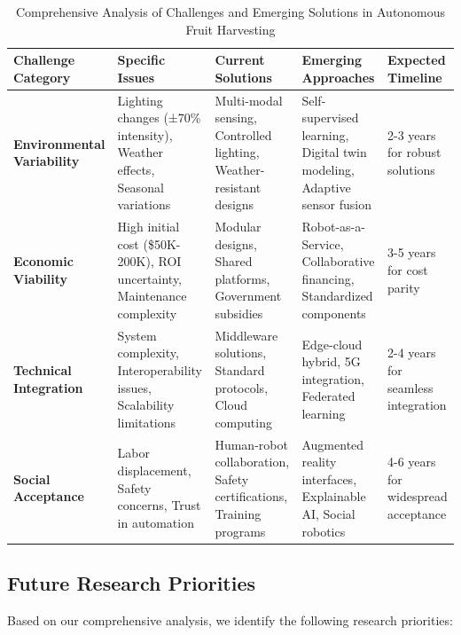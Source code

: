 \documentclass[a4paper,fleqn]{cas-dc}
\begin{document}
\begin{table}[htbp]
\centering
\footnotesize
\caption{Comprehensive Analysis of Challenges and Emerging Solutions in Autonomous Fruit Harvesting}
\label{tab:challenges_comprehensive}
\begin{tabular}{p{}p{}p{}p{}p{}}
\toprule
\textbf{Challenge Category} & \textbf{Specific Issues} & \textbf{Current Solutions} & \textbf{Emerging Approaches} & \textbf{Expected Timeline} \\
\midrule
\textbf{Environmental Variability} & Lighting changes (±70\% intensity), Weather effects, Seasonal variations & Multi-modal sensing, Controlled lighting, Weather-resistant designs & Self-supervised learning, Digital twin modeling, Adaptive sensor fusion & 2-3 years for robust solutions \\
\midrule
\textbf{Economic Viability} & High initial cost (\$50K-200K), ROI uncertainty, Maintenance complexity & Modular designs, Shared platforms, Government subsidies & Robot-as-a-Service, Collaborative financing, Standardized components & 3-5 years for cost parity \\
\midrule
\textbf{Technical Integration} & System complexity, Interoperability issues, Scalability limitations & Middleware solutions, Standard protocols, Cloud computing & Edge-cloud hybrid, 5G integration, Federated learning & 2-4 years for seamless integration \\
\midrule
\textbf{Social Acceptance} & Labor displacement, Safety concerns, Trust in automation & Human-robot collaboration, Safety certifications, Training programs & Augmented reality interfaces, Explainable AI, Social robotics & 4-6 years for widespread acceptance \\
\bottomrule
\end{tabular}
\end{table}

\subsection{Future Research Priorities}

Based on our comprehensive analysis, we identify the following research priorities:
\end{document}
